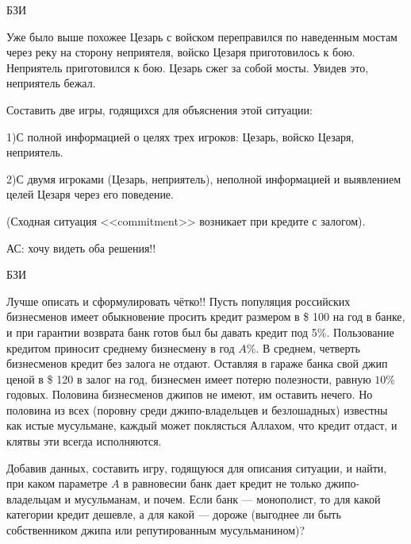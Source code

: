 \begin{problem} 
\begin{source}
БЗИ
\end{source} 
{\red Уже было выше похожее}
Цезарь с войском
переправился по наведенным мостам через реку на сторону
неприятеля, войско Цезаря приготовилось к бою. Неприятель
приготовился к бою. Цезарь сжег за собой мосты. Увидев это,
неприятель бежал.

Составить две игры, годящихся для объяснения этой ситуации:

1)С полной информацией о целях трех игроков: Цезарь, войско
Цезаря, неприятель. 

2)С двумя игроками (Цезарь,
неприятель), неполной информацией и выявлением целей Цезаря
через его поведение.

(Сходная ситуация <<commitment>> возникает при кредите с
залогом).

{\red АС: хочу видеть оба решения!!}

\begin{sol}

\end{sol}
\end{problem}




\begin{problem}\begin{source}
БЗИ
\end{source}
{\red Лучше описать и сформулировать чётко!!}
Пусть популяция российских бизнесменов имеет обыкновение
просить кредит размером в \$ 100 на год в банке, и при
гарантии возврата банк готов был бы давать кредит под 5\%.
Пользование кредитом приносит среднему бизнесмену в год
$A$\%. В среднем, четверть бизнесменов кредит без залога не
отдают. Оставляя в гараже банка свой джип ценой в \$ 120  в
залог на год, бизнесмен имеет потерю полезности, равную
$10$\% годовых. Половина бизнесменов джипов не имеют, им
оставить нечего. Но половина из всех (поровну среди
джипо-владельцев и безлошадных) известны как истые
мусульмане, каждый может поклясться Аллахом, что кредит
отдаст, и клятвы эти всегда исполняются.

Добавив данных, составить игру, годящуюся для описания ситуации, и
найти, при каком параметре $A$ в равновесии банк дает
кредит не только джипо-владельцам и мусульманам, и почем.
Если банк --- монополист, то для какой категории кредит
дешевле, а для какой --- дороже (выгоднее ли быть собственником
джипа или репутированным мусульманином)?

\begin{sol}

\end{sol}
\end{problem}



